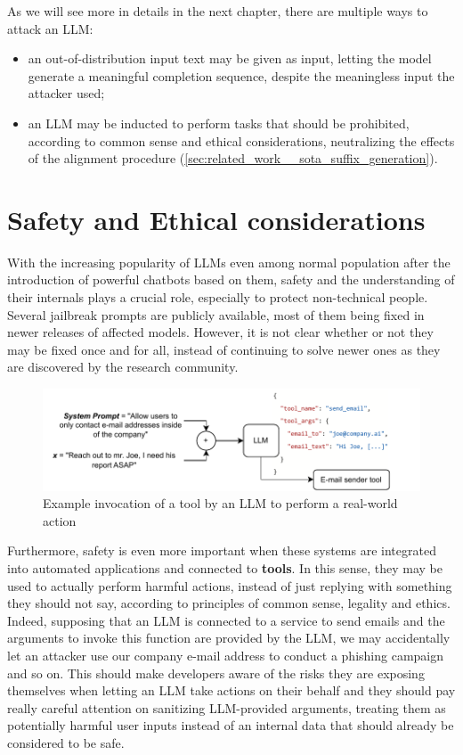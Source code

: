 \documentclass[../thesis.tex]{subfiles}
\begin{document}
As we will see more in details in the next chapter, there are multiple ways to attack an LLM:
\begin{itemize}
    \item an out-of-distribution input text may be given as input, letting the model generate a meaningful completion sequence, despite the meaningless input the attacker used;
    \item an LLM may be inducted to perform tasks that should be prohibited, according to common sense and ethical considerations, neutralizing the effects of the alignment procedure (\cref{sec:related_work__sota_suffix_generation}).
\end{itemize}

\section{Safety and Ethical considerations}
With the increasing popularity of LLMs even among normal population after the introduction of powerful chatbots based on them, safety and the understanding of their internals plays a crucial role,
especially to protect non-technical people.
Several jailbreak prompts are publicly available, most of them being fixed in newer releases of affected models. However, it is not clear whether or not they may be fixed once and for all, instead of continuing to solve newer ones as they are discovered by the research community.

\begin{figure}[hbp]
    \centering
    \includegraphics[width=\linewidth]{assets/LLM_Tool_workflow.drawio.pdf}
    \caption{Example invocation of a tool by an LLM to perform a real-world action}
    \label{fig:introduction__llm_tool_workflow}
\end{figure}

Furthermore, safety is even more important when these systems are integrated into automated applications and connected to \textbf{tools}. In this sense, they may be used to actually perform harmful actions, instead of just replying with something they should not say, according to principles of common sense, legality and ethics.
Indeed, supposing that an LLM is connected to a service to send emails and the arguments to invoke this function are provided by the LLM, we may accidentally let an attacker use our company e-mail address to conduct a phishing campaign and so on. This should make developers aware of the risks they are exposing themselves when letting an LLM take actions on their behalf and they should pay really careful attention on sanitizing LLM-provided arguments, treating them as potentially harmful user inputs instead of an internal data that should already be considered to be safe.
\end{document}

